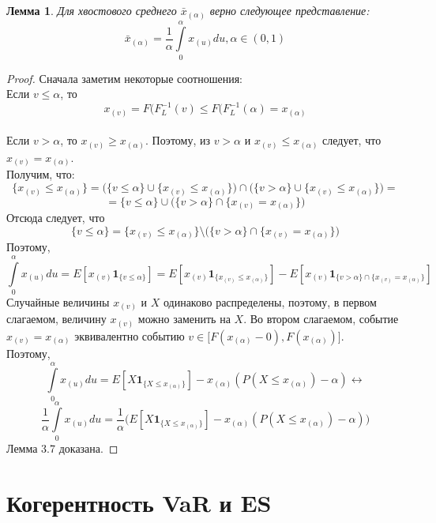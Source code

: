 \documentclass[18pt,a4paper]{article}
\theoremstyle{plain}
\newtheorem{Lemma}{Лемма}[section]
\theoremstyle{definition}
\begin{document}
\begin{Lemma}
Для хвостового среднего $\bar{x}_{(\alpha)} $ верно следующее представление:
\begin{equation}
\bar{x}_{(\alpha)} = \frac{1}{\alpha} \int\limits^\alpha_0 x_{(u)}du, \alpha \in (0,1)
\end{equation}
\end{Lemma}
\begin{proof}
Сначала заметим некоторые соотношения:\\
Если $v \le \alpha$, то $$x_{(v)} =  F(F^{-1}_L (v) \le  F(F^{-1}_L (\alpha) = x_{(\alpha)}        $$\\
Если $v > \alpha$, то $x_{(v)} \ge x_{(\alpha)}$. Поэтому, из $v>\alpha$ и $x_{(v)} \le x_{(\alpha)}$ следует, что $x_{(v)} = x_{(\alpha)} $.\\
Получим, что:\\
$$
\{x_{(v)} \le x_{(\alpha)} \} = \Big( \{v \le \alpha\} \cup  \{ x_{(v)} \le x_{(\alpha)} \} \Big) \cap \Big( \{v>\alpha\} \cup  \{ x_{(v)} \le x_{(\alpha)}  \} \Big) =
$$
$$
= \{v \le \alpha\} \cup \big( \{v>\alpha\} \cap  \{ x_{(v)} = x_{(\alpha)}  \} \big)
$$
Отсюда следует, что
$$
\{v \le \alpha\} = \{ x_{(v)} \le x_{(\alpha)}  \} \setminus  \big( \{v>\alpha\} \cap  \{ x_{(v)} = x_{(\alpha)}  \} \big)
$$
Поэтому,
$$
\int\limits^\alpha_0 x_{(u)}du = E[x_{(v)}\mathbf{1}_{\{ v \le \alpha \}}] = E[x_{(v)}\mathbf{1}_{\{ x_{(v)}  \le x_{(\alpha)}  \}}] - E[x_{(v)}\mathbf{1}_{\{v>\alpha\} \cap  \{x_{(v)}=x_{(\alpha)}\}}]
$$
Случайные величины $x_{(v)}$ и $X$ одинаково распределены, поэтому, в первом слагаемом, величину $x_{(v)}$ можно заменить на $X$. Во втором слагаемом, событие $x_{(v)} = x_{(\alpha)}$ эквивалентно
событию $v \in \Big[F(x_{(\alpha)}-0),F(x_{(\alpha)})\Big]$.\\
Поэтому,\\
$$
\int\limits^\alpha_0 x_{(u)}du = E[X \mathbf{1}_{\{X \le x_{(\alpha)} \}}] - x_{(\alpha)}(P(X \le x_{(\alpha)}) - \alpha) \leftrightarrow
$$
$$
\frac{1}{\alpha} \int\limits^\alpha_0 x_{(u)}du = \frac{1}{\alpha} \Big( E[X \mathbf{1}_{\{X \le x_{(\alpha)} \}}] - x_{(\alpha)}(P(X \le x_{(\alpha)}) - \alpha) \Big)
$$
Лемма 3.7 доказана.
\end{proof}

\centering\section{Когерентность VaR и ES}
\end{document}
